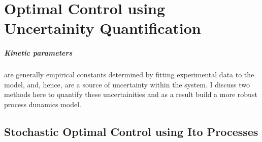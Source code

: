 
\chapter{Optimal Control using Uncertainity Quantification}

\paragraph{Kinetic parameters} are generally empirical constants determined by fitting experimental data to the model, and, hence, are a source of uncertainty within the system. I discuss two methods here to quantify these uncertainities and as a result build a more robust process dunamics model.

\section{Stochastic Optimal Control using Ito Processes}

